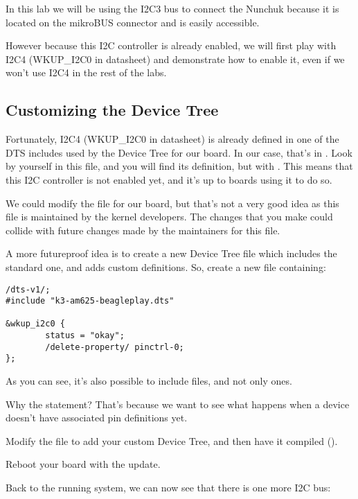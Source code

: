 In this lab we will be using the I2C3 bus to connect the Nunchuk
because it is located on the mikroBUS connector and is easily
accessible.

However because this I2C controller is already enabled, we will
first play with I2C4 (WKUP\_I2C0 in datasheet) and demonstrate
how to enable it, even if we won't use I2C4 in the rest of the labs.

\subsection{Customizing the Device Tree}

Fortunately, I2C4 (WKUP\_I2C0 in datasheet) is already defined
in one of the DTS includes used by the Device Tree for our board.
In our case, that's in .
Look by yourself in this file, and you will find its definition, but with
. This means that this I2C controller is not
enabled yet, and it's up to boards using it to do so.

We could modify the  file
for our board, but that's not a very good idea as this file is
maintained by the kernel developers. The changes that you make could
collide with future changes made by the maintainers for this file.

A more futureproof idea is to create a new Device Tree file which
includes the standard one, and adds custom definitions. So, create a
new  file containing:

\begin{verbatim}
/dts-v1/;
#include "k3-am625-beagleplay.dts"

&wkup_i2c0 {
        status = "okay";
        /delete-property/ pinctrl-0;
};
\end{verbatim}

As you can see, it's also possible to include  files, and not
only  ones.

Why the  statement? That's because we want to see what happens when a
device doesn't have associated pin definitions yet.

Modify the  file to add your custom
Device Tree, and then have it compiled ().

Reboot your board with the update.

Back to the running system, we can now see that there is one more
I2C bus:

